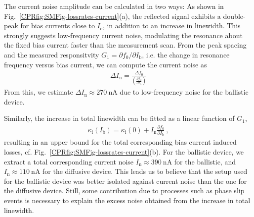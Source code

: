 The current noise amplitude can be calculated in two ways:
%
As shown in Fig.~\ref{CPRfig:SMFig-lossrates-current}(a), the reflected signal exhibits a double-peak for bias currents close to $I_\text{c}$, in addition to an increase in linewidth.
%
This strongly suggests low-frequency current noise, modulating the resonance about the fixed bias current faster than the measurement scan.
%
From the peak spacing and the measured responsitvity $G_1=\partial f_0/\partial I_\text{b}$, i.e. the change in resonance frequency versus bias current, we can compute the current noise as
\begin{align}
\Delta I_\text{n} = \frac{\Delta f_0}{\left( \frac{\partial f_0}{\partial I_\text{b}} \right)}
\label{CPReq:currnoise-a}
\end{align}
%
From this, we estimate $\Delta I_\text{n}\approx\SI{270}{\nano\ampere}$ due to low-frequency noise for the ballistic device.


Similarly, the increase in total linewidth can be fitted as a linear function of $G_1$, 
%
\begin{align}
\kappa_\text{i}(I_\text{b})=\kappa_\text{i}(0)+I_\text{n} \frac{\partial f_0}{\partial I_\text{b}} \ ,
\label{CPReq:currnoise-b}
\end{align}
%
resulting in an upper bound for the total corresponding bias current induced losses, cf. Fig.~\ref{CPRfig:SMFig-lossrates-current}(b).
%
For the ballistic device, we extract a total corresponding current noise $I_\text{n}\approx\SI{390}{\nano\ampere}$ for the ballistic, and $I_\text{n}\approx\SI{110}{\nano\ampere}$ for the diffusive device.
%
This leads us to believe that the setup used for the ballistic device was better isolated against current noise than the one for the diffusive device.
%
Still, some contribution due to processes such as phase slip events is necessary to explain the excess noise obtained from the increase in total linewidth.

